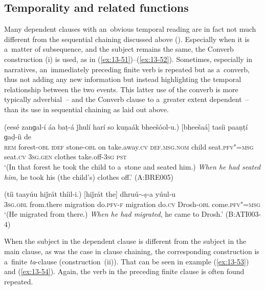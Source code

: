 \subsection{Temporality and related functions}
\label{subsec:13-4-1}

 Many dependent clauses with an~obvious temporal reading are in fact not much different from the sequential chaining discussed above (). Especially when it is a~matter of subsequence, and the subject remains the same, the Converb construction (i) is used, as in (\ref{ex:13-51})--(\ref{ex:13-52}). Sometimes, especially in narratives, an~immediately preceding finite verb is repeated but as a~converb, thus not adding any new information but instead highlighting the temporal relationship between the two events. This latter use of the converb is more typically adverbial~-- and the Converb clause to a~greater extent dependent~-- than its use in sequential chaining as laid out above.

\begin{exe}
\ex
\label{ex:13-51}
\gll (eesé zanɡal-í áa baṭ-á ǰhulí harí so kuṇaák bheešóol-u.) [bheešaá] tasíi paaṇṭí ɡaḍ-íi de \\
\textsc{rem} forest-\textsc{obl} \textsc{idef} stone-\textsc{obl} on take.away.\textsc{cv}   \textsc{def.msg.nom} child seat.\textsc{pfv"=msg} seat.\textsc{cv} \textsc{3sg.gen} clothes take.off-\textsc{3sg} \textsc{pst} \\
\glt `(In that forest he took the child to a~stone and seated him.) \textit{When he had seated him,} he took his (the child's) clothes off.' (A:BRE005)

\ex
\label{ex:13-52}
\gll (tíi taayúu hiǰrát thíil-i.) [hiǰrát the] dhruú$\sim$ṣ-a yúul-u \\
\textsc{3sg.obl} from.there migration do.\textsc{pfv-f}    migration do.\textsc{cv} Drosh-\textsc{obl} come.\textsc{pfv"=msg} \\
\glt `(He migrated from there.) \textit{When he had migrated}, he came to Drosh.' (B:ATI003-4) 
\end{exe}

When the subject in the dependent clause is different from the subject in the main clause, as was the case in clause chaining, the corresponding construction is a~finite \textit{ta}-clause (construction~(ii)). That can be seen in example (\ref{ex:13-53}) and (\ref{ex:13-54}). Again, the verb in the preceding finite clause is often found repeated.

